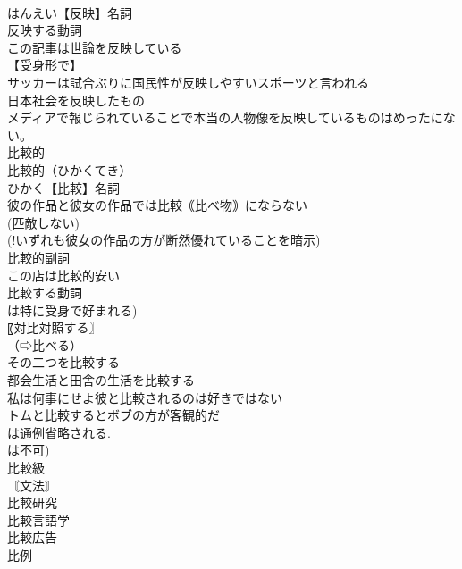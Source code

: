 \documentclass[8pt]{extreport}
\begin{document}
\begin{CJK}{UTF8}{min}
\\	はんえい【反映】名詞
\\	反映する動詞
\\	この記事は世論を反映している
\\	【受身形で】
\\	サッカーは試合ぶりに国民性が反映しやすいスポーツと言われる
\\	日本社会を反映したもの
\\	メディアで報じられていることで本当の人物像を反映しているものはめったにない。
\\	比較的
\\	比較的（ひかくてき）
\\	ひかく【比較】名詞
\\	彼の作品と彼女の作品では比較｟比べ物｠にならない
\\	(匹敵しない) 
\\	(!いずれも彼女の作品の方が断然優れていることを暗示)
\\	比較的副詞
\\	この店は比較的安い
\\	比較する動詞
\\	は特に受身で好まれる) 
\\	〖対比対照する〗
\\	（⇨比べる）
\\	その二つを比較する
\\	都会生活と田舎の生活を比較する
\\	私は何事にせよ彼と比較されるのは好きではない
\\	トムと比較するとボブの方が客観的だ
\\	は通例省略される. 
\\	は不可) 
\\	比較級
\\	〘文法〙
\\	比較研究
\\	比較言語学
\\	比較広告
\\	[｟話｠ 
\\	比較宗教学
\\	比較文化
\\	比較文学
\\	かくさ【較差】
\\	【変動幅】
\\	年間の気温較差
\\	ひれい【比例】名詞
\\	〖釣り合い〗
\\	〖比率〗
\\	（⇨比率）
\\	正[反]比例

\end{CJK}
\end{document}
